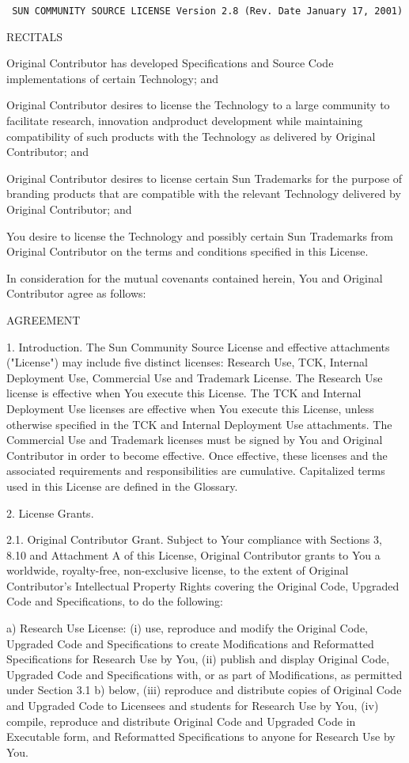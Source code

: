 \setlength{\baselineskip}{0.5\oldbaselineskip}
{\tiny\tt
\noindent
SUN COMMUNITY SOURCE LICENSE Version 2.8 (Rev.  Date January 17, 2001)

RECITALS

Original Contributor has developed Specifications and Source Code
implementations of certain Technology; and

Original Contributor desires to license the Technology to a large
community to facilitate research, innovation andproduct development
while maintaining compatibility of such products with the Technology
as delivered by Original Contributor; and

Original Contributor desires to license certain Sun Trademarks for the
purpose of branding products that are compatible with the relevant
Technology delivered by Original Contributor; and

You desire to license the Technology and possibly certain Sun
Trademarks from Original Contributor on the terms and conditions
specified in this License.

In consideration for the mutual covenants contained herein, You and
Original Contributor agree as follows:

AGREEMENT

1.  Introduction.  The Sun Community Source License and effective
attachments ("License") may include five distinct licenses: Research
Use, TCK, Internal Deployment Use, Commercial Use and Trademark
License.  The Research Use license is effective when You execute this
License.  The TCK and Internal Deployment Use licenses are effective
when You execute this License, unless otherwise specified in the TCK
and Internal Deployment Use attachments.  The Commercial Use and
Trademark licenses must be signed by You and Original Contributor in
order to become effective.  Once effective, these licenses and the
associated requirements and responsibilities are cumulative.
Capitalized terms used in this License are defined in the Glossary.

2.  License Grants.

2.1.  Original Contributor Grant.  Subject to Your compliance with
Sections 3, 8.10 and Attachment A of this License, Original
Contributor grants to You a worldwide, royalty-free, non-exclusive
license, to the extent of Original Contributor's Intellectual Property
Rights covering the Original Code, Upgraded Code and Specifications,
to do the following:

a) Research Use License: (i) use, reproduce and modify the Original
Code, Upgraded Code and Specifications to create Modifications and
Reformatted Specifications for Research Use by You, (ii) publish and
display Original Code, Upgraded Code and Specifications with, or as
part of Modifications, as permitted under Section 3.1 b) below, (iii)
reproduce and distribute copies of Original Code and Upgraded Code to
Licensees and students for Research Use by You, (iv) compile,
reproduce and distribute Original Code and Upgraded Code in Executable
form, and Reformatted Specifications to anyone for Research Use by
You.

}

